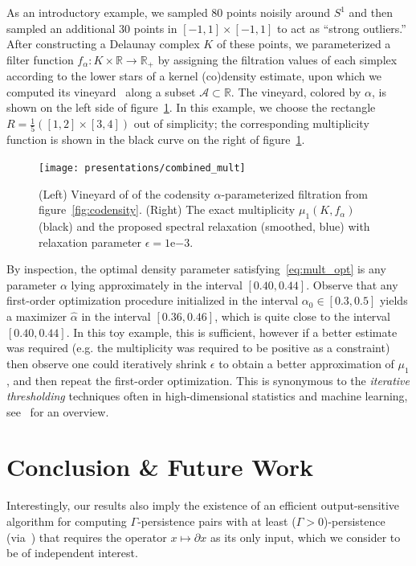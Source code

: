 \documentclass[10pt]{article}
\numberwithin{equation}{section}
\newcommand{\+}{%
	\raisebox{0.18ex}{\scaleobj{0.55}{+}}
}
\theoremstyle{definition}
\theoremstyle{definition}
\begin{document}
As an introductory example, we sampled $80$ points noisily around $S^1$ and then sampled an additional $30$ points in $[-1,1] \times [-1,1]$ to act as ``strong outliers.'' After constructing a Delaunay complex $K$ of these points, we parameterized a filter function $f_\alpha : K \times \mathbb{R} \to \mathbb{R}_+$ by assigning the filtration values of each simplex according to the lower stars of a kernel (co)density estimate, upon which we computed its vineyard~\cite{cohen2006vines} along a subset $\mathcal{A} \subset \mathbb{R}$. The vineyard, colored by $\alpha$, is shown on the left side of figure~\ref{fig:vineyard_codensity}. In this example, we choose the rectangle $R = \frac{1}{5}([1, 2] \times [3,4])$ out of simplicity; the corresponding multiplicity function is shown in the black curve on the right of figure~\ref{fig:vineyard_codensity}. 
\begin{figure}[h]
	\centering
	\texttt{[image: presentations/combined\_mult]}
	\caption{(Left) Vineyard of of the codensity $\alpha$-parameterized filtration from figure~\ref{fig:codensity}. (Right) The exact multiplicity $\mu_1(K, f_\alpha)$ (black) and the proposed spectral relaxation (smoothed, blue) with relaxation parameter $\epsilon = 1\mathrm{e}{-3}$.}\label{fig:vineyard_codensity}
\end{figure}
By inspection, the optimal density parameter satisfying~\eqref{eq:mult_opt} is any parameter $\alpha$ lying approximately in the interval $[0.40, 0.44]$. 
Observe that any first-order optimization procedure initialized in the interval $\alpha_0 \in [0.3, 0.5]$ yields a maximizer $\hat{\alpha}$ in the interval $[0.36, 0.46]$, which is quite close to the interval $[0.40, 0.44]$. In this toy example, this is sufficient, however if a better estimate was required (e.g. the multiplicity was required to be positive as a constraint) then observe one could iteratively shrink $\epsilon$ to obtain a better approximation of $\mu_1$, and then repeat the first-order optimization. 
This is synonymous to the \emph{iterative thresholding} techniques often in high-dimensional statistics and machine learning, see~\cite{} for an overview.

\section{Conclusion \& Future Work}
Interestingly, our results also imply the existence of an efficient output-sensitive algorithm for computing $\Gamma$-persistence pairs with at least ($\Gamma >0$)-persistence (via~\cite{chen2011output}) that requires the operator $x \mapsto \partial x$ as its only input, which we consider to be of independent interest. 
\end{document}
